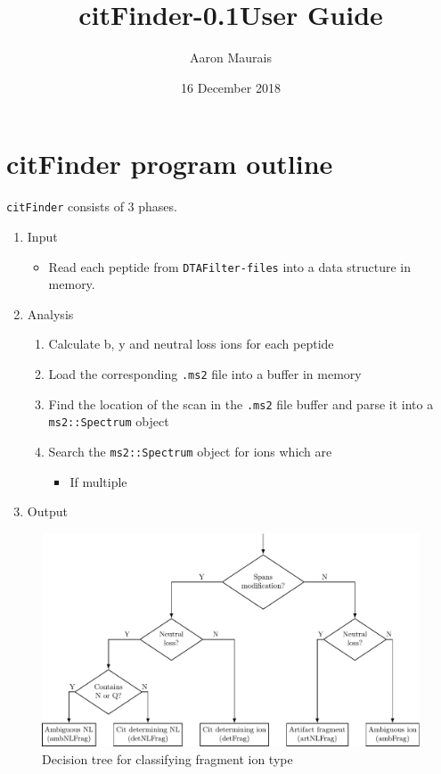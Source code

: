 \documentclass[12pt]{article}
\newcommand{\VERSION}{0.1}
\begin{document}
	
	\title{citFinder-\VERSION \space User Guide}
	\author{Aaron Maurais}
	\date{16 December 2018}
	
	\maketitle

	\section{citFinder program outline} %
	\label{sec:citfinder_program_outline}

	\texttt{citFinder} consists of 3 phases.  

	\begin{enumerate}
		\item Input
			\begin{itemize}
				\item Read each peptide from \texttt{DTAFilter-files} into a data structure in memory.
			\end{itemize}
		\item Analysis
			\begin{enumerate}%
				\item Calculate b, y and neutral loss ions for each peptide
				
				\item Load the corresponding \texttt{.ms2} file into a buffer in memory
				
				\item Find the location of the scan in the \texttt{.ms2} file buffer and parse it into a \texttt{ms2::Spectrum} object

				\item Search the \texttt{ms2::Spectrum} object for ions which are
        		\begin{itemize}
        			\item If multiple 
        		\end{itemize}

			\end{enumerate}
		\item Output
	\end{enumerate}

	\begin{figure}[h!]
		\centering
		\includegraphics[width=\textwidth]{ionType_decision_tree.pdf}
		\caption{Decision tree for classifying fragment ion type}
		\label{fig:ionType_tree}
	\end{figure}
\end{document}
